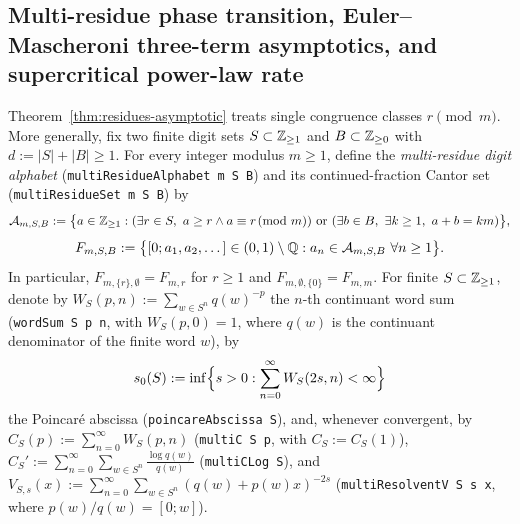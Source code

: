 \subsection{Multi-residue phase transition, Euler--Mascheroni three-term asymptotics, and supercritical power-law rate}\label{sec:multi-residue}

Theorem~\ref{thm:residues-asymptotic} treats single congruence classes $r\pmod m$.
More generally, fix two finite digit sets $S\subset\mathbb{Z}_{\ge1}$ and
$B\subset\mathbb{Z}_{\ge0}$ with $d:=|S|+|B|\ge1$. For every integer modulus $m\ge1$,
define the \emph{multi-residue digit alphabet}
(\texttt{multiResidueAlphabet m S B}) and its continued-fraction Cantor set
(\texttt{multiResidueSet m S B}) by
\[
\mathcal A_{m,S,B}:=\bigl\{a\in\Z_{\ge1} : (\exists r\in S,\ a\ge r\wedge a\equiv r\!\!\pmod m)\ \text{or}\ (\exists b\in B,\ \exists k\ge1,\ a+b=km)\bigr\},
\]
\[
F_{m,S,B}:=\bigl\{[0;a_1,a_2,\dots]\in(0,1)\setminus\mathbb{Q} : a_n\in\mathcal A_{m,S,B}\ \forall n\ge1\bigr\}.
\]
In particular, $F_{m,\{r\},\emptyset}=F_{m,r}$ for $r\ge1$ and
$F_{m,\emptyset,\{0\}}=F_{m,m}$.
For finite $S\subset\mathbb{Z}_{\ge1}$, denote by $W_S(p,n):=\sum_{w\in S^n}q(w)^{-p}$
the $n$-th continuant word sum (\texttt{wordSum S p n}, with $W_S(p,0)=1$, where
$q(w)$ is the continuant denominator of the finite word $w$), by
\[
s_0(S):=\inf\Bigl\{s>0:\sum_{n=0}^\infty W_S(2s,n)<\infty\Bigr\}
\]
the Poincar\'e abscissa (\texttt{poincareAbscissa S}), and, whenever convergent,
by $C_S(p):=\sum_{n=0}^\infty W_S(p,n)$ (\texttt{multiC S p}, with $C_S:=C_S(1)$),
$C_S':=\sum_{n=0}^\infty\sum_{w\in S^n}\frac{\log q(w)}{q(w)}$ (\texttt{multiCLog S}),
and $V_{S,s}(x):=\sum_{n=0}^\infty\sum_{w\in S^n}(q(w)+p(w)x)^{-2s}$
(\texttt{multiResolventV S s x}, where $p(w)/q(w)=[0;w]$).

